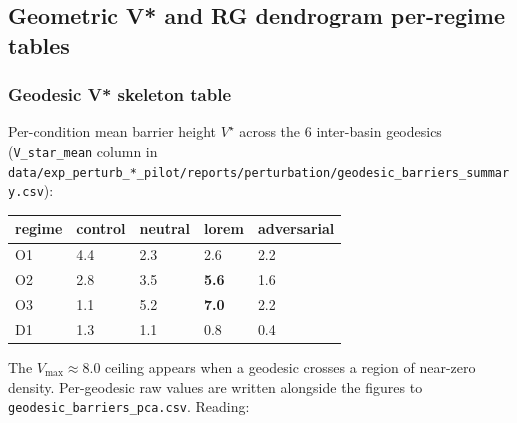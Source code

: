 \documentclass{article}
\theoremstyle{plain}
\theoremstyle{definition}
\begin{document}
\subsection{Geometric V* and RG dendrogram per-regime tables}

\subsubsection*{Geodesic V* skeleton table}

Per-condition mean barrier height $V^\star$ across the 6 inter-basin
geodesics (\texttt{V\_star\_mean} column in
\texttt{data/exp\_perturb\_*\_pilot/reports/perturbation/geodesic\_barriers\_summary.csv}):

\begin{table}[h!]
\centering
\small
\begin{tabularx}{\textwidth}{lYYYY}
\toprule
regime & control & neutral & lorem & adversarial \\
\midrule
O1 & 4.4 & 2.3 & 2.6 & 2.2 \\
O2 & 2.8 & 3.5 & \textbf{5.6} & 1.6 \\
O3 & 1.1 & 5.2 & \textbf{7.0} & 2.2 \\
D1 & 1.3 & 1.1 & 0.8 & 0.4 \\
\bottomrule
\end{tabularx}
\end{table}

The $V_{\max} \approx 8.0$ ceiling appears when a geodesic crosses
a region of near-zero density. Per-geodesic raw values are written
alongside the figures to \texttt{geodesic\_barriers\_pca.csv}. Reading:
\end{document}

